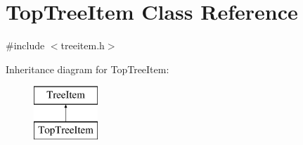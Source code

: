 \hypertarget{class_top_tree_item}{\section{\-Top\-Tree\-Item \-Class \-Reference}
\label{class_top_tree_item}
}


{\ttfamily \#include $<$treeitem.\-h$>$}

\-Inheritance diagram for \-Top\-Tree\-Item\-:\begin{figure}[H]
\begin{center}
\leavevmode
\includegraphics[height=2.000000cm]{class_top_tree_item}
\end{center}
\end{figure}
